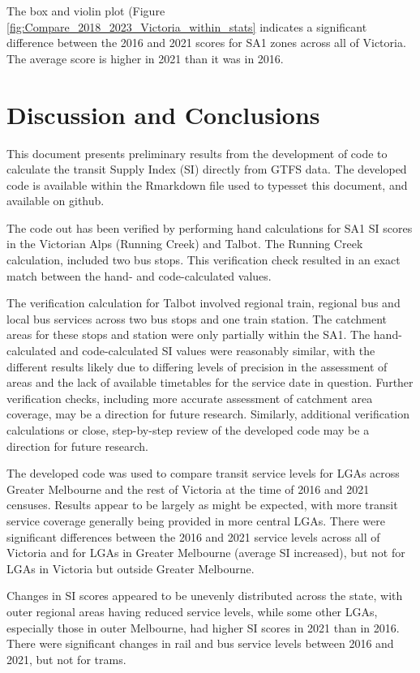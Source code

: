 \documentclass[]{tufte-book}
\begin{document}
The box and violin plot (Figure
\ref{fig:Compare_2018_2023_Victoria_within_stats} indicates a
significant difference between the 2016 and 2021 scores for SA1 zones
across all of Victoria. The average score is higher in 2021 than it was
in 2016.

\hypertarget{discussion-and-conclusions}{%
\chapter{Discussion and Conclusions}\label{discussion-and-conclusions}}

This document presents preliminary results from the development of code
to calculate the \citet{currie2007identifying} transit Supply Index (SI)
directly from GTFS data. The developed code is available within the
Rmarkdown file used to typesset this document, and available on github.

The code out has been verified by performing hand calculations for SA1
SI scores in the Victorian Alps (Running Creek) and Talbot. The Running
Creek calculation, included two bus stops. This verification check
resulted in an exact match between the hand- and code-calculated values.

The verification calculation for Talbot involved regional train,
regional bus and local bus services across two bus stops and one train
station. The catchment areas for these stops and station were only
partially within the SA1. The hand-calculated and code-calculated SI
values were reasonably similar, with the different results likely due to
differing levels of precision in the assessment of areas and the lack of
available timetables for the service date in question. Further
verification checks, including more accurate assessment of catchment
area coverage, may be a direction for future research. Similarly,
additional verification calculations or close, step-by-step review of
the developed code may be a direction for future research.

The developed code was used to compare transit service levels for LGAs
across Greater Melbourne and the rest of Victoria at the time of 2016
and 2021 censuses. Results appear to be largely as might be expected,
with more transit service coverage generally being provided in more
central LGAs. There were significant differences between the 2016 and
2021 service levels across all of Victoria and for LGAs in Greater
Melbourne (average SI increased), but not for LGAs in Victoria but
outside Greater Melbourne.

Changes in SI scores appeared to be unevenly distributed across the
state, with outer regional areas having reduced service levels, while
some other LGAs, especially those in outer Melbourne, had higher SI
scores in 2021 than in 2016. There were significant changes in rail and
bus service levels between 2016 and 2021, but not for trams.
\end{document}

